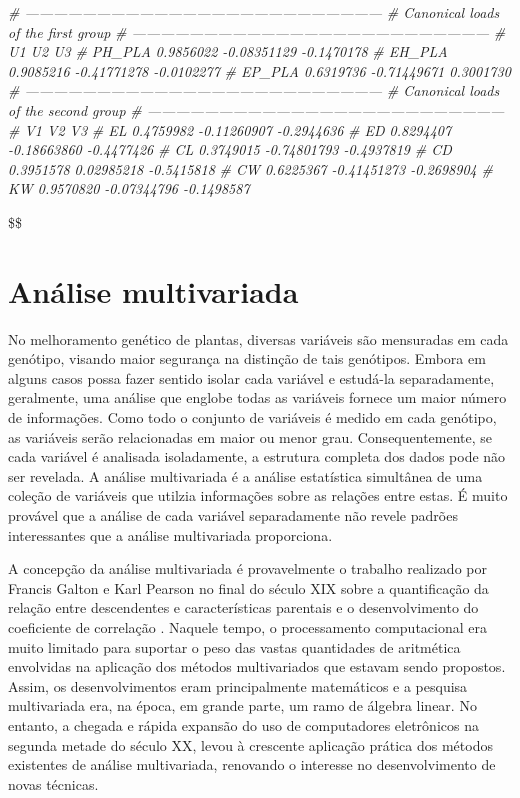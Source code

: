 \documentclass[
]{book}
\newenvironment{Shaded}{\begin{snugshade}}{\end{snugshade}}
\newcommand{\CommentTok}[1]{\textcolor[rgb]{0.56,0.35,0.01}{\textit{#1}}}
\begin{document}
\begin{Shaded}
\begin{Highlighting}[]
\CommentTok{# ---------------------------------------------------------------------------}
\CommentTok{# Canonical loads of the first group }
\CommentTok{# ---------------------------------------------------------------------------}
\CommentTok{#               U1          U2         U3}
\CommentTok{# PH_PLA 0.9856022 -0.08351129 -0.1470178}
\CommentTok{# EH_PLA 0.9085216 -0.41771278 -0.0102277}
\CommentTok{# EP_PLA 0.6319736 -0.71449671  0.3001730}
\CommentTok{# ---------------------------------------------------------------------------}
\CommentTok{# Canonical loads of the second group }
\CommentTok{# ---------------------------------------------------------------------------}
\CommentTok{#           V1          V2         V3}
\CommentTok{# EL 0.4759982 -0.11260907 -0.2944636}
\CommentTok{# ED 0.8294407 -0.18663860 -0.4477426}
\CommentTok{# CL 0.3749015 -0.74801793 -0.4937819}
\CommentTok{# CD 0.3951578  0.02985218 -0.5415818}
\CommentTok{# CW 0.6225367 -0.41451273 -0.2698904}
\CommentTok{# KW 0.9570820 -0.07344796 -0.1498587}
\end{Highlighting}
\end{Shaded}

\$\$

\hypertarget{multivariate}{%
\chapter{Análise multivariada}\label{multivariate}}

No melhoramento genético de plantas, diversas variáveis são mensuradas em cada genótipo, visando maior segurança na distinção de tais genótipos. Embora em alguns casos possa fazer sentido isolar cada variável e estudá-la separadamente, geralmente, uma análise que englobe todas as variáveis fornece um maior número de informações. Como todo o conjunto de variáveis é medido em cada genótipo, as variáveis serão relacionadas em maior ou menor grau. Consequentemente, se cada variável é analisada isoladamente, a estrutura completa dos dados pode não ser revelada. A análise multivariada é a análise estatística simultânea de uma coleção de variáveis que utilzia informações sobre as relações entre estas. É muito provável que a análise de cada variável separadamente não revele padrões interessantes que a análise multivariada proporciona.

A concepção da análise multivariada  é provavelmente o trabalho realizado por Francis Galton e Karl Pearson no final do século XIX sobre a quantificação da relação entre descendentes e características parentais e o desenvolvimento do coeficiente de correlação \citep{Galton1888}. Naquele tempo, o processamento computacional era muito limitado para suportar o peso das vastas quantidades de aritmética envolvidas na aplicação dos métodos multivariados que estavam sendo propostos. Assim, os desenvolvimentos eram principalmente matemáticos e a pesquisa multivariada era, na época, em grande parte, um ramo de álgebra linear. No entanto, a chegada e rápida expansão do uso de computadores eletrônicos na segunda metade do século XX, levou à crescente aplicação prática dos métodos existentes de análise multivariada, renovando o interesse no desenvolvimento de novas técnicas.
\end{document}
